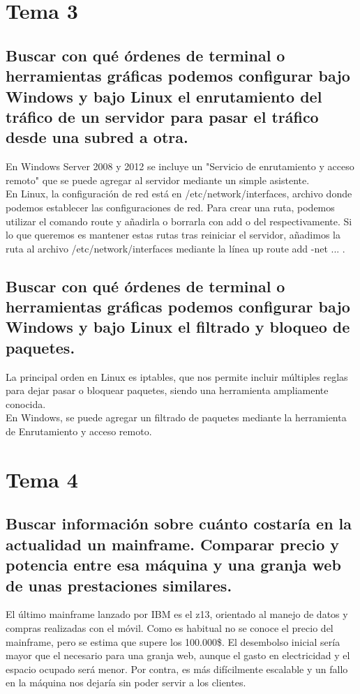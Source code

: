 \section{ Tema 3 }
\subsection{ Buscar con qué órdenes de terminal o herramientas gráficas podemos configurar bajo Windows y bajo Linux el enrutamiento del tráfico de un servidor para pasar el tráfico desde una subred a otra. }
En Windows Server 2008 y 2012 se incluye un "Servicio de enrutamiento y acceso remoto" que se puede agregar al servidor mediante un simple asistente.\\
En Linux, la configuración de red está en /etc/network/interfaces, archivo donde podemos establecer las configuraciones de red. Para crear una ruta, podemos utilizar el comando route y añadirla o borrarla con add o del respectivamente. Si lo que queremos es mantener estas rutas tras reiniciar el servidor, añadimos la ruta al archivo /etc/network/interfaces mediante la línea up route add -net ... .\\

\subsection{ Buscar con qué órdenes de terminal o herramientas gráficas podemos configurar bajo Windows y bajo Linux el filtrado y bloqueo de paquetes.  }

La principal orden en Linux es iptables, que nos permite incluir múltiples reglas para dejar pasar o bloquear paquetes, siendo una herramienta ampliamente conocida.\\
En Windows, se puede agregar un filtrado de paquetes mediante la herramienta de Enrutamiento y acceso remoto.\\

\section{ Tema 4 }
\subsection{ Buscar información sobre cuánto costaría en la actualidad un mainframe. Comparar precio y potencia entre esa máquina y una granja web de unas prestaciones similares. }

El último mainframe lanzado por IBM es el z13, orientado al manejo de datos y compras realizadas con el móvil. Como es habitual no se conoce el precio del mainframe, pero se estima que supere los 100.000\$. El desembolso inicial sería mayor que el necesario para una granja web, aunque el gasto en electricidad y el espacio ocupado será menor. Por contra, es más difícilmente escalable y un fallo en la máquina nos dejaría sin poder servir a los clientes.\\

